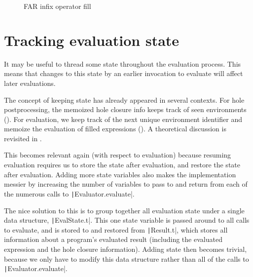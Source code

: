\begin{figure}
  \centering
  \begin{singlespace}
  \end{singlespace}
  \caption{FAR infix operator fill}
  \label{fig:far-infix-operator-fill}
\end{figure}

\section{Tracking evaluation state}
\label{sec:eval-state}

It may be useful to thread some state throughout the evaluation process. This means that changes to this state by an earlier invocation to evaluate will affect later evaluations.

The concept of keeping state has already appeared in several contexts. For hole postprocessing, the memoized hole closure info keeps track of seen environments (). For evaluation, we keep track of the next unique environment identifier and memoize the evaluation of filled expressions (). A theoretical discussion is revisited in .

This becomes relevant again (with respect to evaluation) because resuming evaluation requires us to store the state after evaluation, and restore the state after evaluation. Adding more state variables also makes the implementation messier by increasing the number of variables to pass to and return from each of the numerous calls to \texttt|Evaluator.evaluate|.

The nice solution to this is to group together all evaluation state under a single data structure, \texttt|EvalState.t|. This one state variable is passed around to all calls to evaluate, and is stored to and restored from \texttt|Result.t|, which stores all information about a program's evaluated result (including the evaluated expression and the hole closure information). Adding state then becomes trivial, because we only have to modify this data structure rather than all of the calls to \texttt|Evaluator.evaluate|.

